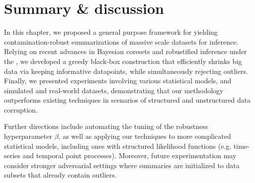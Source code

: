 \section{Summary \& discussion}%
\label{sec:conclusion}
In this chapter, we proposed a general purpose framework for yielding  contamination-robust summarizations of massive scale datasets for inference. Relying on recent advances in Bayesian coresets and robustified inference under the \bdiv{}, we developed a greedy black-box construction that efficiently shrinks big data via keeping informative datapoints, while simultaneously rejecting outliers.
 Finally, we presented experiments involving various statistical models, and simulated and real-world datasets, demonstrating that our methodology outperforms existing techniques in scenarios of structured and unstructured data corruption. 

Further directions include automating the tuning of the robustness hyperparameter $\beta$, as well as applying our techniques to more complicated statistical models, including ones with structured likelihood functions (e.g. time-series and temporal point processes). Moreover, future experimentation may consider stronger adversarial settings where summaries are initialized to data subsets that already contain outliers. 
